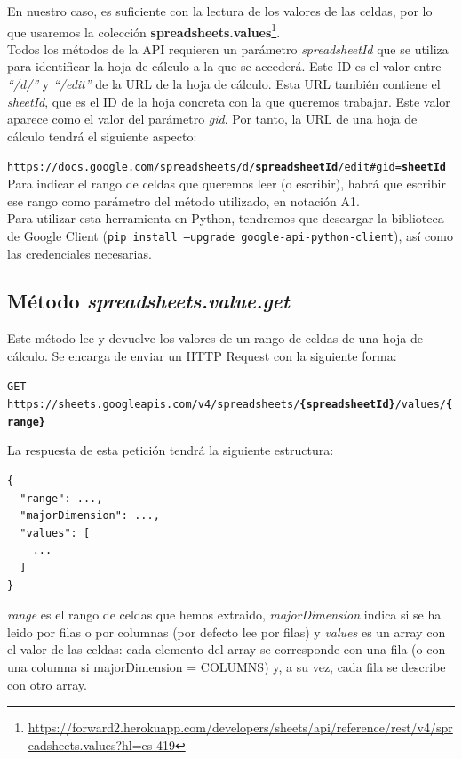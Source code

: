 \documentclass[a4paper, 12pt]{book}
\begin{document}
En nuestro caso, es suficiente con la lectura de los valores de las celdas, por lo que usaremos la colección \textbf{spreadsheets.values}\footnote{\url{https://forward2.herokuapp.com/developers/sheets/api/reference/rest/v4/spreadsheets.values?hl=es-419}}.\\

Todos los métodos de la API requieren un parámetro \textit{spreadsheetId} que se utiliza para identificar la hoja de cálculo a la que se accederá. Este ID es el valor entre \textit{``/d/''} y \textit{``/edit''} de la URL de la hoja de cálculo. Esta URL también contiene el \textit{sheetId}, que es el ID de la hoja concreta con la que queremos trabajar. Este valor aparece como el valor del parámetro \textit{gid}. Por tanto, la URL de una hoja de cálculo tendrá el siguiente aspecto:

{\footnotesize\texttt{https://docs.google.com/spreadsheets/d/\textbf{spreadsheetId}/edit\#gid=\textbf{sheetId}}}\\

Para indicar el rango de celdas que queremos leer (o escribir), habrá que escribir ese rango como parámetro del método utilizado, en notación A1.\\

Para utilizar esta herramienta en Python, tendremos que descargar la biblioteca de Google Client (\texttt{pip install --upgrade google-api-python-client}), así como las credenciales necesarias.\\


\subsection{Método \textit{spreadsheets.value.get}}
\label{spreadsheets_value_get}
Este método lee y devuelve los valores de un rango de celdas de una hoja de cálculo. Se encarga de enviar un HTTP Request con la siguiente forma:

{\footnotesize\texttt{GET https://sheets.googleapis.com/v4/spreadsheets/\textbf{\{spreadsheetId\}}/values/\textbf{\{range\}}}}

La respuesta de esta petición tendrá la siguiente estructura:
{\footnotesize\begin{verbatim}
{
  "range": ...,
  "majorDimension": ...,
  "values": [
    ...
  ]
}
\end{verbatim}}

\textit{range} es el rango de celdas que hemos extraido, \textit{majorDimension} indica si se ha leido por filas o por columnas (por defecto lee por filas) y \textit{values} es un array con el valor de las celdas: cada elemento del array se corresponde con una fila (o con una columna si majorDimension = COLUMNS) y, a su vez, cada fila se describe con otro array.\\
\end{document}
